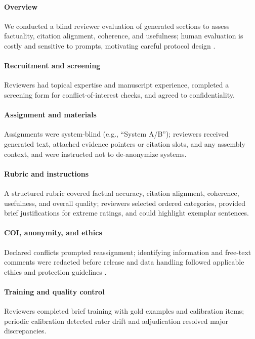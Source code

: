 \paragraph{Overview} We conducted a blind reviewer evaluation of generated sections to assess factuality, citation alignment, coherence, and usefulness; human evaluation is costly and sensitive to prompts, motivating careful protocol design \cite{web_healey_2025_developing_a_framework_to_support_human_evaluati,web_h_m_l_inen_2021_the_great_misalignment_problem_in_human_evaluati}.

\paragraph{Recruitment and screening} Reviewers had topical expertise and manuscript experience, completed a screening form for conflict-of-interest checks, and agreed to confidentiality.

\paragraph{Assignment and materials} Assignments were system-blind (e.g., “System A/B”); reviewers received generated text, attached evidence pointers or citation slots, and any assembly context, and were instructed not to de-anonymize systems.

\paragraph{Rubric and instructions} A structured rubric covered factual accuracy, citation alignment, coherence, usefulness, and overall quality; reviewers selected ordered categories, provided brief justifications for extreme ratings, and could highlight exemplar sentences.

\paragraph{COI, anonymity, and ethics} Declared conflicts prompted reassignment; identifying information and free-text comments were redacted before release and data handling followed applicable ethics and protection guidelines \cite{web_human_2022_advanced_data_protection_control_adpc_an_interdi}.

\paragraph{Training and quality control} Reviewers completed brief training with gold examples and calibration items; periodic calibration detected rater drift and adjudication resolved major discrepancies.

